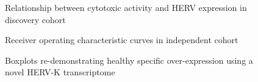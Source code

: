 \documentclass[11pt,letterpaper]{article}
\begin{document}
\begin{figure}[ht]
  \caption{Relationship between cytotoxic activity and HERV expression in discovery cohort}
  \label{fig:cd8}
\end{figure}

\begin{figure}[ht]
  \caption{Receiver operating characteristic curves in independent cohort}
  \label{fig:rocC}
\end{figure}

\begin{figure}[ht]
  \caption{Boxplots re-demonstrating healthy specific over-expression using a novel HERV-K transcriptome}
  \label{fig:grabski_method}
\end{figure}
\end{document}
